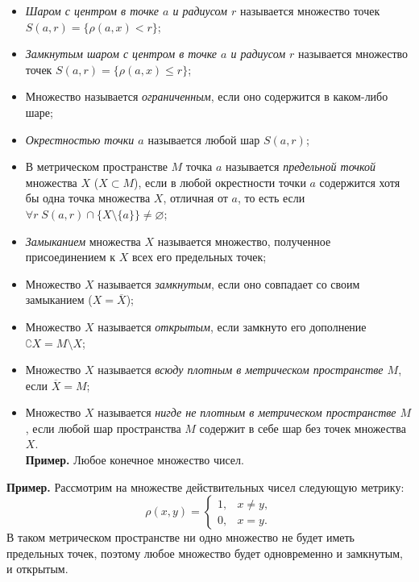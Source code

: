 \documentclass[12pt,a4paper, titlepage]{article}
\begin{document}
\begin{itemize}
\item \textit{Шаром с центром в точке $a$ и радиусом $r$} называется множество точек $S(a, r) =\lbrace \rho(a, x) < r \rbrace$;

\item \textit{Замкнутым шаром с центром в точке $a$ и радиусом $r$} называется множество точек $S(a, r) =\lbrace \rho(a, x) \leqslant r \rbrace$;

\item Множество называется \textit{ограниченным}, если оно содержится в каком-либо шаре;

\item \textit{Окрестностью точки $a$} называется любой шар $S(a, r)$;

\item В метрическом пространстве $M$ точка $a$ называется \textit{предельной точкой} множества $X$ ($X \subset M$), если в любой окрестности точки $a$ содержится хотя бы одна точка множества $X$, отличная от $a$, то есть если $\forall r \; S(a, r) \cap \lbrace X \setminus \{a\} \rbrace \neq \varnothing$;

\item \textit{Замыканием} множества $X$ называется множество, полученное присоединением к $X$ всех его предельных точек;

\item Множество $X$ называется \textit{замкнутым}, если оно совпадает со своим замыканием ($X = \overline{X}$);

\item Множество $X$ называется \textit{открытым}, если замкнуто его дополнение $\complement X = M \setminus X$;

\item Множество $X$ называется \textit{всюду плотным в метрическом пространстве $M$}, если $\overline{X} = M$;


\item Множество $X$ называется \textit{нигде не плотным в метрическом пространстве $M$}, если любой шар пространства $M$ содержит в себе шар без точек множества $X$. \\
\textbf{Пример.} Любое конечное множество чисел.

\end{itemize}

\textbf{Пример.} Рассмотрим на множестве действительных чисел следующую метрику:
$$
\rho (x, y) = \begin{cases}
1, & x \neq y, \\
0, & x = y.
\end{cases}
$$
В таком метрическом пространстве ни одно множество не будет иметь предельных точек, поэтому любое множество будет одновременно и замкнутым, и открытым.\\
\end{document}
